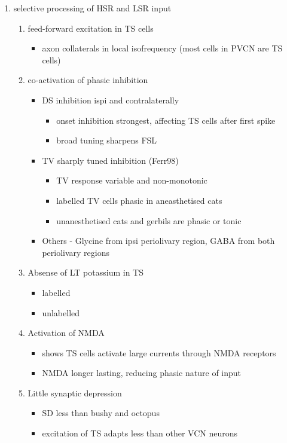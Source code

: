 \begin{enumerate}
\item selective processing of HSR and LSR input
\begin{enumerate}
\item feed-forward excitation in TS cells
\begin{itemize}
\item axon collaterals in local isofrequency (most cells in PVCN are TS cells)
\end{itemize}
\item co-activation of phasic inhibition
\begin{itemize}
\item DS inhibition ispi and contralaterally
\begin{itemize}
\item onset inhibition strongest, affecting TS cells after first spike
\item broad tuning sharpens FSL
\end{itemize}
\item TV sharply tuned inhibition (Ferr98)
\begin{itemize}
\item TV response variable and non-monotonic
\item \citep{Rhode:1999}  labelled TV cells phasic in aneasthetised cats
\item unanesthetised cats and gerbils are phasic or tonic  \citep{DingVoigt:1997,ShofnerYoung:1985}
\end{itemize}
\item Others - Glycine from ipsi periolivary region, GABA from both
          periolivary regions \citep{AdamsWarr:1976,ShoreHelfertEtAl:1991,OstapoffBensonEtAl:1997}
\end{itemize}
\item Absense of LT potassium in TS
\begin{itemize}
\item labelled \citep{ManisMarx:1991,BalOertel:2001,FerragamoOertel:2002,CaoShatadalEtAl:2007}
\item unlabelled \citep{RothmanManis:2003,RothmanManis:2003a,RothmanManis:2003b,Rothman:1999}
\end{itemize}
\item Activation of NMDA
\begin{itemize}
\item \citep{CaoOertel:2010} shows TS cells activate large currents through NMDA receptors
\item NMDA longer lasting, reducing phasic nature of input
\end{itemize}
\item Little synaptic depression
\begin{itemize}
\item SD less than bushy and octopus \citep{WuOertel:1987,ChandaXu-Friedman:2010,CaoOertel:2010}
\item excitation of TS adapts less than other VCN neurons
\end{itemize}
\end{enumerate}
\end{enumerate}



